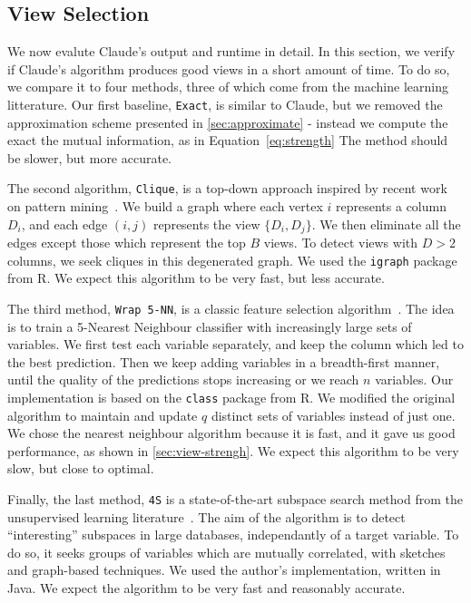 \subsection{View Selection}
\label{sec:exp-view-selection} 

We now evalute Claude's output and runtime in detail. In this section, we
verify if Claude's algorithm produces good views in a short amount of time. To
do so, we compare it to four methods, three of which come from the machine
learning litterature.  Our first baseline, \texttt{Exact}, is similar to
Claude, but we removed the approximation scheme presented in
\ref{sec:approximate} - instead we compute the exact the mutual information, as
in Equation~\ref{eq:strength} The method should be slower, but more accurate. 

The second algorithm, \texttt{Clique}, is a top-down approach inspired by
recent work on pattern mining~\cite{xie2010max}. We build a graph where each
vertex $i$ represents a column $D_i$, and each edge $(i,j)$ represents the view
$\{D_i, D_j\}$. We then eliminate all the edges except those which represent
the top $B$ views. To detect views with $D>2$ columns, we seek cliques in this
degenerated graph. We used the \texttt{igraph} package from R. We expect this
algorithm to be very fast, but less accurate.

The third method, \texttt{Wrap 5-NN}, is a classic feature selection
algorithm~\cite{guyon2003introduction}. The idea is to train a 5-Nearest
Neighbour classifier with increasingly large sets of variables. We first test
each variable separately, and keep the column which led to the best prediction.
Then we keep adding variables in a breadth-first manner, until the
quality of the predictions stops increasing or we reach $n$ variables. Our
implementation is based on the \texttt{class} package from R.  We modified the
original algorithm to maintain and update $q$ distinct sets of variables
instead of just one. We chose the nearest neighbour algorithm because it is
fast, and it gave us good performance, as shown in \ref{sec:view-strengh}. We
expect this algorithm to be very slow, but close to optimal.

Finally, the last method, \texttt{4S} is a state-of-the-art subspace search
method from the unsupervised learning literature~\cite{nguyen20134s}. The aim
of the algorithm is to detect ``interesting'' subspaces in large databases,
independantly of a target variable. To do so, it seeks groups of variables
which are mutually correlated, with sketches and graph-based techniques.  We
used the author's implementation, written in Java. We expect the algorithm to
be very fast and reasonably accurate.

